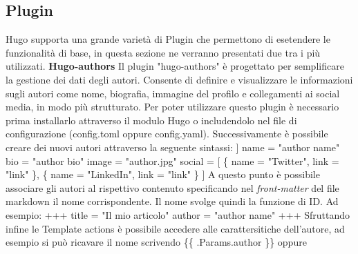 \documentclass[target=bach,aauheader=]{thud}
\begin{document}
\subsection{Plugin}
Hugo supporta una grande varietà di Plugin che permettono di esetendere le funzionalità di base, in questa sezione ne verranno presentati due tra i più utilizzati.
\newline 
\newline 
\textbf{{\fontsize{12}{14}\selectfont Hugo-authors}}
\newline \newline
Il plugin "hugo-authors" è progettato per semplificare la gestione dei dati degli autori. Consente di definire e visualizzare le informazioni sugli autori come nome, biografia, immagine del profilo e collegamenti ai social media, in modo più strutturato.
\newline
Per poter utilizzare questo plugin è necessario prima installarlo attraverso il modulo Hugo o includendolo nel file di configurazione (config.toml oppure config.yaml).
Successivamente è possibile creare dei nuovi autori attraverso la seguente sintassi:
\newline \newline
[author]
\newline
[[author.authors]]
\newline
name = "author name"
\newline 
bio = "author bio"
\newline 
image = "author.jpg"
\newline
social = [
\newline
\qquad    \{ name = "Twitter", link = "link" \},
\newline
\qquad    \{ name = "LinkedIn", link = "link" \}
\newline
]
\newline \newline
A questo punto è possibile associare gli autori al rispettivo contenuto specificando nel \textit{front-matter} del file markdown il nome corrispondente. Il nome svolge quindi la funzione di ID. Ad esempio:
\newline \newline
+++
\newline title = "Il mio articolo"
\newline author = "author name"
\newline 
+++
\newline \newline
Sfruttando infine le Template actions è possibile accedere alle carattersitiche dell'autore, ad esempio si può ricavare il nome scrivendo \{\{ .Params.author \}\} oppure 
\end{document}
